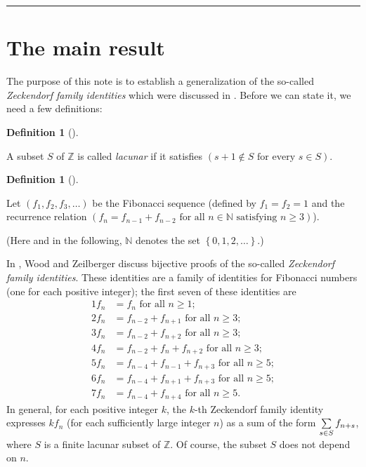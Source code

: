 \documentclass[numbers=enddot,12pt,final,onecolumn,notitlepage]{scrartcl}%
\numberwithin{exer}{section}
\theoremstyle{definition}
\newtheorem{defi}[theo]{Definition}
\newenvironment{definition}[1][]
{\begin{defi}[#1]\begin{leftbar}}
{\end{leftbar}\end{defi}}
\let\sumnonlimits\sum
\renewcommand{\sum}{\sumnonlimits\limits}
\begin{document}
\hrule


\section{The main result}

The purpose of this note is to establish a generalization of the so-called
\textit{Zeckendorf family identities} which were discussed in \cite{1}. Before
we can state it, we need a few definitions:

\begin{definition}
A subset $S$ of $\mathbb{Z}$ is called \textit{lacunar} if it satisfies
$\left(  s+1\notin S\text{ for every }s\in S\right)  $.
\end{definition}

\begin{definition}
Let $\left(  f_{1},f_{2},f_{3},\ldots\right)  $ be the Fibonacci sequence
(defined by $f_{1}=f_{2}=1$ and the recurrence relation $\left(  f_{n}%
=f_{n-1}+f_{n-2}\text{ for all }n\in\mathbb{N}\text{ satisfying }%
n\geq3\right)  $).
\end{definition}

(Here and in the following, $\mathbb{N}$ denotes the set $\left\{
0,1,2,\ldots\right\}  $.)

In \cite{1}, Wood and Zeilberger discuss bijective proofs of the so-called
\textit{Zeckendorf family identities}. These identities are a family of
identities for Fibonacci numbers (one for each positive integer); the first
seven of these identities are%
\begin{align*}
1f_{n}  &  =f_{n}\text{ for all }n\geq1;\\
2f_{n}  &  =f_{n-2}+f_{n+1}\text{ for all }n\geq3;\\
3f_{n}  &  =f_{n-2}+f_{n+2}\text{ for all }n\geq3;\\
4f_{n}  &  =f_{n-2}+f_{n}+f_{n+2}\text{ for all }n\geq3;\\
5f_{n}  &  =f_{n-4}+f_{n-1}+f_{n+3}\text{ for all }n\geq5;\\
6f_{n}  &  =f_{n-4}+f_{n+1}+f_{n+3}\text{ for all }n\geq5;\\
7f_{n}  &  =f_{n-4}+f_{n+4}\text{ for all }n\geq5.
\end{align*}
In general, for each positive integer $k$, the $k$-th Zeckendorf family
identity expresses $kf_{n}$ (for each sufficiently large integer $n$) as a sum
of the form $\sum\limits_{s\in S}f_{n+s}$, where $S$ is a finite lacunar
subset of $\mathbb{Z}$. Of course, the subset $S$ does not depend on $n$.
\end{document}

